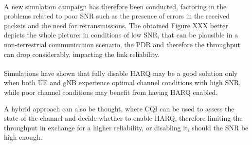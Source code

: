 \paragraph{}
A new simulation campaign has therefore been conducted, factoring in the problems related to poor \ac{SNR} such as the presence of errors in the received packets and the need for retransmissions. The obtained Figure XXX better depicts the whole picture: in conditions of low \ac{SNR}, that can be plausible in a non-terrestrial communication scenario, the \ac{PDR} and therefore the throughput can drop considerably, impacting the link reliability.
\paragraph{}
Simulations have shown that fully disable \ac{HARQ} may be a good solution only when both \ac{UE} and \ac{gNB} experience optimal channel conditions with high \ac{SNR}, while poor channel conditions may benefit from having \ac{HARQ} enabled.

A hybrid approach can also be thought, where \ac{CQI} can be used to assess the state of the channel and decide whether to enable \ac{HARQ}, therefore limiting the throughput in exchange for a higher reliability, or disabling it, should the \ac{SNR} be high enough.

